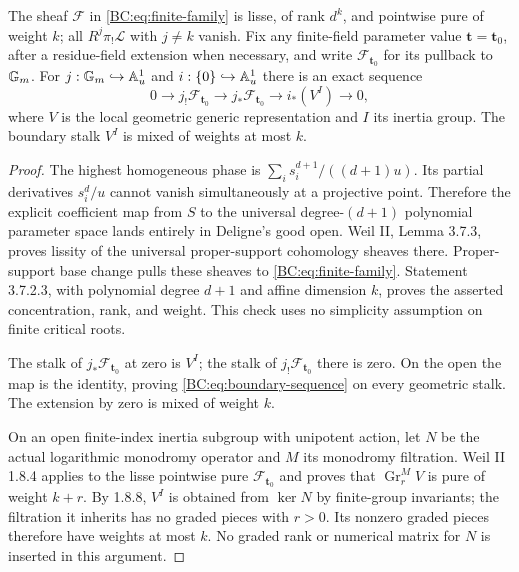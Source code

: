\begin{proposition}
The sheaf $\mathcal F$ in \eqref{BC:eq:finite-family} is lisse, of rank
$d^k$, and pointwise pure of weight $k$; all $R^j\pi_!\mathcal L$ with
$j\ne k$ vanish.  Fix any finite-field parameter value
$\mathbf t=\mathbf t_0$, after a residue-field extension when necessary,
and write $\mathcal F_{\mathbf t_0}$ for its pullback to ${\mathbb G_m}$.
For $j:{\mathbb G_m}\hookrightarrow\mathbb A^1_u$ and $i:\{0\}\hookrightarrow\mathbb A^1_u$
there is an exact sequence
\begin{equation}
 0\longrightarrow j_!\mathcal F_{\mathbf t_0}
  \longrightarrow j_*\mathcal F_{\mathbf t_0}
  \longrightarrow i_*(V^I)\longrightarrow0,                \label{BC:eq:boundary-sequence}
\end{equation}
where $V$ is the local geometric generic representation and $I$ its
inertia group.  The boundary stalk $V^I$ is mixed of weights at most $k$.
\end{proposition}
\begin{proof}
The highest homogeneous phase is
$\sum_i s_i^{d+1}/((d+1)u)$.  Its partial derivatives $s_i^d/u$
cannot vanish simultaneously at a projective point.  Therefore the
explicit coefficient map from $S$ to the universal degree-$(d+1)$
polynomial parameter space lands entirely in Deligne's good open.
Weil II, Lemma 3.7.3, proves lissity of the universal proper-support
cohomology sheaves there.  Proper-support base change pulls these sheaves
to \eqref{BC:eq:finite-family}.  Statement 3.7.2.3, with polynomial degree
$d+1$ and affine dimension $k$, proves the asserted concentration, rank,
and weight.  This check uses no simplicity assumption on finite critical
roots.

The stalk of $j_*\mathcal F_{\mathbf t_0}$ at zero is $V^I$; the stalk
of $j_!\mathcal F_{\mathbf t_0}$ there is zero.  On the open the map is
the identity, proving \eqref{BC:eq:boundary-sequence} on every geometric
stalk.  The extension by zero is mixed of weight $k$.

On an open finite-index inertia subgroup with unipotent action, let $N$
be the actual logarithmic monodromy operator and $M$ its monodromy
filtration.  Weil II 1.8.4 applies to the lisse pointwise pure
$\mathcal F_{\mathbf t_0}$ and proves that
$\operatorname{Gr}_r^M V$ is pure of weight $k+r$.
By 1.8.8, $V^I$ is obtained from $\ker N$ by finite-group invariants;
the filtration it inherits has no graded pieces with $r>0$.
Its nonzero graded pieces therefore have weights at most $k$.
No graded rank or numerical matrix for $N$ is inserted in this argument.
\end{proof}

